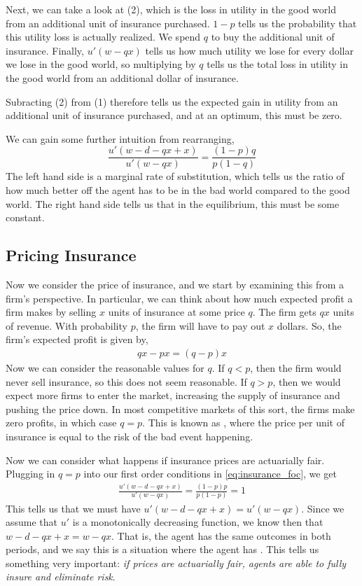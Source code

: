 Next, we can take a look at (2), which is the loss in utility in the good world from an additional unit of insurance purchased. $1 - p$ tells us the probability that this utility loss is actually realized. We spend $q$ to buy the additional unit of insurance. Finally, $u'(w - qx)$ tells us how much utility we lose for every dollar we lose in the good world, so multiplying by $q$ tells us the total loss in utility in the good world from an additional dollar of insurance.

Subracting (2) from (1) therefore tells us the expected gain in utility from an additional unit of insurance purchased, and at an optimum, this must be zero.

We can gain some further intuition from rearranging,
\begin{equation} \label{eq:insurance_foc}
    \frac{u'(w - d - qx + x)}{u'(w - qx)} = \frac{(1 - p)q}{p(1 - q)}
\end{equation}
The left hand side is a marginal rate of substitution, which tells us the ratio of how much better off the agent has to be in the bad world compared to the good world. The right hand side tells us that in the equilibrium, this must be some constant.

\subsection*{Pricing Insurance}
Now we consider the price of insurance, and we start by examining this from a firm's perspective. In particular, we can think about how much expected profit a firm makes by selling $x$ units of insurance at some price $q$. The firm gets $qx$ units of revenue. With probability $p$, the firm will have to pay out $x$ dollars. So, the firm's expected profit is given by,
\begin{align*}
    qx - px = (q - p)x
\end{align*}
Now we can consider the reasonable values for $q$. If $q < p$, then the firm would never sell insurance, so this does not seem reasonable. If $q > p$, then we would expect more firms to enter the market, increasing the supply of insurance and pushing the price down. In most competitive markets of this sort, the firms make zero profits, in which case $q = p$. This is known as , where the price per unit of insurance is equal to the risk of the bad event happening. 

Now we can consider what happens if insurance prices are actuarially fair. Plugging in $q = p$ into our first order conditions in \ref{eq:insurance_foc}, we get
\begin{align*}
    \frac{u'(w - d - qx + x)}{u'(w - qx)} = \frac{(1 - p)p}{p(1 - p)} = 1
\end{align*}
This tells us that we must have $u'(w - d - qx + x) = u'(w - qx)$. Since we assume that $u'$ is a monotonically decreasing function, we know then that $w - d - qx + x = w - qx$. That is, the agent has the same outcomes in both periods, and we say this is a situation where the agent has . This tells us something very important: \emph{if prices are actuarially fair, agents are able to fully insure and eliminate risk}. 

